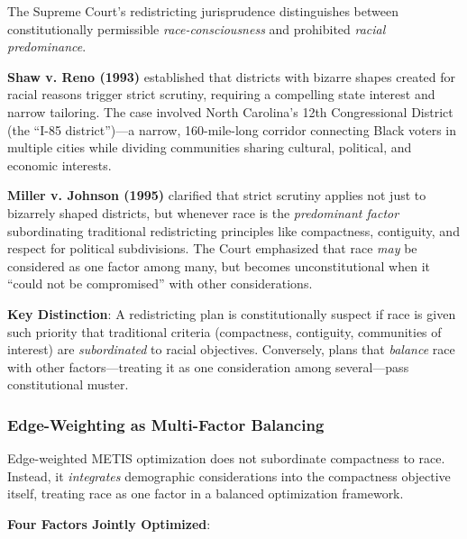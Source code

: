 The Supreme Court's redistricting jurisprudence distinguishes between constitutionally permissible \emph{race-consciousness} and prohibited \emph{racial predominance}.

\textbf{Shaw v. Reno (1993)} established that districts with bizarre shapes created for racial reasons trigger strict scrutiny, requiring a compelling state interest and narrow tailoring. The case involved North Carolina's 12th Congressional District (the ``I-85 district'')---a narrow, 160-mile-long corridor connecting Black voters in multiple cities while dividing communities sharing cultural, political, and economic interests.

\textbf{Miller v. Johnson (1995)} clarified that strict scrutiny applies not just to bizarrely shaped districts, but whenever race is the \emph{predominant factor} subordinating traditional redistricting principles like compactness, contiguity, and respect for political subdivisions. The Court emphasized that race \emph{may} be considered as one factor among many, but becomes unconstitutional when it ``could not be compromised'' with other considerations.

\textbf{Key Distinction}: A redistricting plan is constitutionally suspect if race is given such priority that traditional criteria (compactness, contiguity, communities of interest) are \emph{subordinated} to racial objectives. Conversely, plans that \emph{balance} race with other factors---treating it as one consideration among several---pass constitutional muster.

\subsubsection{Edge-Weighting as Multi-Factor Balancing}

Edge-weighted METIS optimization does not subordinate compactness to race. Instead, it \emph{integrates} demographic considerations into the compactness objective itself, treating race as one factor in a balanced optimization framework.

\textbf{Four Factors Jointly Optimized}:

